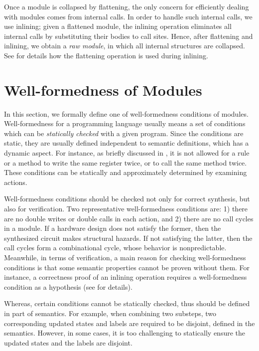 Once a module is collapsed by flattening, the only concern for
efficiently dealing with modules comes from internal calls. In order
to handle such internal calls, we use inlining; given a flattened
module, the inlining operation eliminates all internal calls by
substituting their bodies to call sites. Hence, after flattening and
inlining, we obtain a \emph{raw module}, in which all internal
structures are collapsed. See  for details how
the flattening operation is used during inlining.

\section{Well-formedness of Modules}
\label{sec-wf}

In this section, we formally define one of well-formedness conditions
of modules. Well-formedness for a programming language usually means a
set of conditions which can be \emph{statically checked} with a given
program. Since the conditions are static, they are usually defined
independent to semantic definitions, which has a dynamic aspect.  For
instance, as briefly discussed in , it
is not allowed for a rule or a method to write the same register
twice, or to call the same method twice. These conditions can be
statically and approximately determined by examining actions.

Well-formedness conditions should be checked not only for correct
synthesis, but also for verification. Two representative
well-formedness conditions are: 1) there are no double writes or
double calls in each action, and 2) there are no call cycles in a
module. If a hardware design does not satisfy the former, then the
synthesized circuit makes structural hazards. If not satisfying the
latter, then the call cycles form a combinational cycle, whose
behavior is nonpredictable. Meanwhile, in terms of verification, a
main reason for checking well-formedness conditions is that some
semantic properties cannot be proven without them. For instance, a
correctness proof of an inlining operation requires a well-formedness
condition as a hypothesis (see  for
details).

Whereas, certain conditions cannot be statically checked, thus should
be defined in part of semantics. For example, when combining two
substeps, two corresponding updated states and labels are required to
be disjoint, defined in the \Substeps{} semantics. However, in some
cases, it is too challenging to statically ensure the updated states
and the labels are disjoint.

